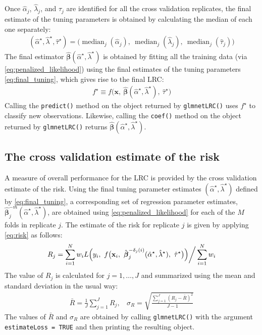 \documentclass{article}
\DeclareMathOperator*{\median}{median}
\begin{document}
Once $\hat\alpha_j$, $\hat\lambda_j$, and $\hat\tau_j$ are identified for all the cross validation replicates, 
the final estimate of the tuning parameters is obtained by calculating the median of each one separately:
\begin{align}
\label{eq:final_tuning}
(\hat\alpha^\star,\hat\lambda^\star,\hat\tau^\star) = \bigl(\median_j(\hat\alpha_j), ~\median_j(\hat\lambda_j),
  ~\median_j(\hat\tau_j) \bigr)
\end{align}
\noindent The final estimator $\hat{\boldsymbol\beta}(\hat\alpha^\star,\hat\lambda^\star)$ is obtained by fitting all the training 
data (via \eqref{eq:penalized_likelihood}) using the final estimates of the tuning parameters \eqref{eq:final_tuning}, 
which gives rise to the final LRC:
\begin{align}
f^\star \equiv f \bigl(\mathbf{x}, ~\hat{\boldsymbol{\beta}}(\hat\alpha^\star, \hat\lambda^\star), ~\hat\tau^\star \bigr)
\end{align}
\noindent Calling the {\tt predict()} method on the object returned by {\tt glmnetLRC()} uses $f^\star$ to classify
new observations.  Likewise, calling the {\tt coef()} method on the object returned by {\tt glmnetLRC()} returns 
$\hat{\boldsymbol\beta}(\hat\alpha^\star,\hat\lambda^\star)$.

\subsection{The cross validation estimate of the risk}

A measure of overall performance for the LRC is provided by the cross validation estimate of the risk. 
Using the final tuning parameter estimates $(\hat\alpha^\star,\hat\lambda^\star)$ defined by \eqref{eq:final_tuning}, 
a corresponding set of regression parameter estimates, $\hat{\boldsymbol\beta}_j^{-m}(\hat\alpha^\star,\hat\lambda^\star)$, 
are obtained using \eqref{eq:penalized_likelihood} 
for each of the $M$ folds in replicate $j$.  The estimate of the risk for replicate $j$ is given by applying \eqref{eq:risk} 
as follows:
\begin{align}
\label{eq:final_risk_j}
R_j  = \sum_{i=1}^N w_i L \Bigl(y_i, ~ f\bigl(\mathbf{x}_i,
~\hat{\boldsymbol\beta}_j^{-\delta_j(i)}(\hat\alpha^\star,\hat\lambda^\star),  ~\hat\tau^\star \bigr) \Bigr) \bigg/ \sum_{i=1}^N w_i
\end{align}
The value of $R_j$ is calculated for $j = 1,\ldots,J$ and summarized using the mean and standard deviation
in the usual way:
\begin{align}
\bar{R} = \frac{1}{J}\sum_{j=1}^J R_j,  ~~~~ \sigma_R = \sqrt{\frac{\sum_{j=1}^J(R_j - \bar{R})^2}{J-1}}
\end{align}
The values of $\bar{R}$ and $\sigma_R$ are obtained by calling {\tt glmnetLRC()} with the argument {\tt estimateLoss = TRUE}
and then printing the resulting object.



\end{document}
